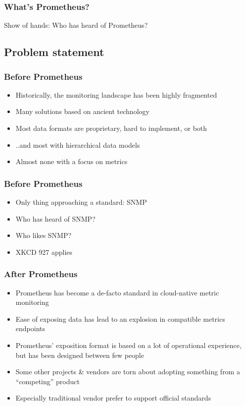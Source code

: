 \documentclass[aspectratio=169]{beamer}
\begin{document}
\begin{frame}
	\frametitle{What's Prometheus?}
		\begin{center}
			\vfill
			Show of hands: Who has heard of Prometheus?
			\vfill
		\end{center}
\end{frame}

\subsection{Problem statement}

\begin{frame}
	\frametitle{Before Prometheus}
	\vfill
	\begin{itemize}
		\item Historically, the monitoring landscape has been highly fragmented
		\item Many solutions based on ancient technology
		\item Most data formats are proprietary, hard to implement, or both
		\item ..and most with hierarchical data models
		\item Almost none with a focus on metrics
	\end{itemize}
	\vfill
\end{frame}

\begin{frame}
	\frametitle{Before Prometheus}
	\vfill
	\begin{itemize}
		\item Only thing approaching a standard: SNMP
		\item Who has heard of SNMP?
		\item Who likes SNMP?
		\item XKCD 927 applies
	\end{itemize}
	\vfill
\end{frame}

\begin{frame}
	\frametitle{After Prometheus}
	\vfill
	\begin{itemize}
		\item Prometheus has become a de-facto standard in cloud-native metric monitoring
		\item Ease of exposing data has lead to an explosion in compatible metrics endpoints
		\item Prometheus’ exposition format is based on a lot of operational experience, but has been designed between few people
		\item Some other projects \& vendors are torn about adopting something from a “competing” product
		\item Especially traditional vendor prefer to support official standards
	\end{itemize}
	\vfill
\end{frame}
\end{document}

